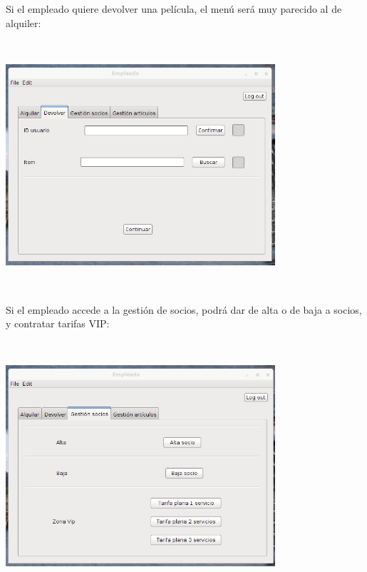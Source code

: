 Si el empleado quiere devolver una película, el menú será muy parecido al de alquiler:\\
\includegraphics[width=10cm, height=10cm, keepaspectratio]{img/empleado-devolver.jpg}\\

Si el empleado accede a la gestión de socios, podrá dar de alta o de baja a socios, y contratar tarifas VIP:\\
\includegraphics[width=10cm, height=10cm, keepaspectratio]{img/empleado-socios.jpg}\\
\clearpage

